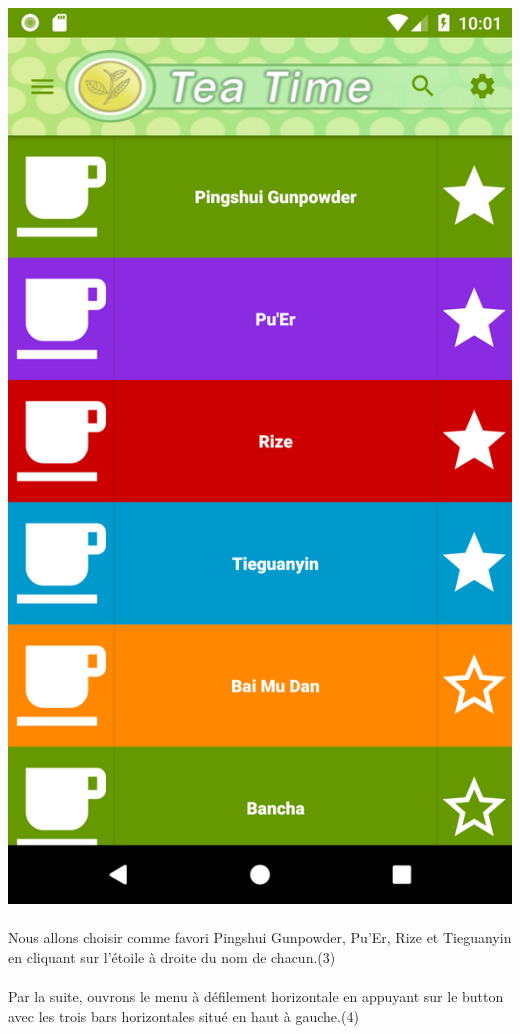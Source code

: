 \documentclass[a4paper,12pt]{article}
\begin{document}
\begin{spacing}{1}
	\includegraphics*[scale=0.1]{Screenshot/06.png}\\\\
	Nous allons choisir comme favori Pingshui Gunpowder, Pu'Er, Rize et Tieguanyin en cliquant sur l'étoile à droite du nom de chacun.(3) \\\\
	Par la suite, ouvrons le menu à défilement horizontale en appuyant sur le button avec les trois bars horizontales situé en haut à gauche.(4)\\\\

\end{spacing}
\end{document}
